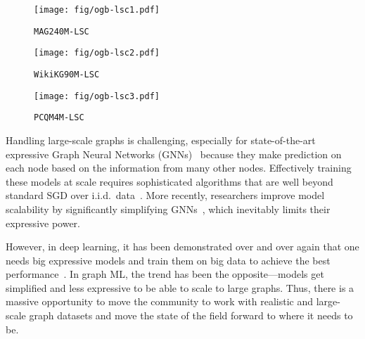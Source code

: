 \documentclass{article}
\newcommand{\challengeshort}{OGB-LSC}
\newcommand{\ag}{\texttt{MAG240M-LSC}}
\newcommand{\wiki}{\texttt{WikiKG90M-LSC}}
\newcommand{\mol}{\texttt{PCQM4M-LSC}}
\newcommand{\cf}{\textit{cf.}}
\begin{document}
\begin{figure*}[t]
  \centering
  \hfill{}
  \begin{subfigure}[t]{0.32\textwidth}
    \centering
    \texttt{[image: fig/ogb-lsc1.pdf]}
    \caption{\ag{}}
  \end{subfigure}
  \hfill{}
  \begin{subfigure}[t]{0.32\textwidth}
    \centering
    \texttt{[image: fig/ogb-lsc2.pdf]}
    \caption{\wiki{}}
  \end{subfigure}
  \hfill{}
  \begin{subfigure}[t]{0.32\textwidth}
    \centering
    \texttt{[image: fig/ogb-lsc3.pdf]}
    \caption{\mol{}}
  \end{subfigure}
  \hfill{}
  \caption{\textbf{Overview of the three \challengeshort{} datasets, covering node-, link-, and graph-level prediction tasks.} \textbf{(a)} \ag{} is a heterogeneous academic graph, and the task is to predict the subject areas of papers (\cf~Section~\ref{subsec:node}) situated in the heterogeneous graph. 
      \textbf{(b)} \wiki{} is a knowledge graph, and the task is to impute missing triplets (\cf~Section~\ref{subsec:link}). \textbf{(c)} \mol{} is a quantum chemistry dataset, and the task is to predict an important molecular property, the HOMO-LUMO gap, of a given molecule (\cf~Section~\ref{subsec:graph}).}
  \label{fig:overview}
\end{figure*}

Handling large-scale graphs is challenging, especially for state-of-the-art expressive Graph Neural Networks (GNNs)~\citep{kipf2016semi,hamilton2017inductive,velivckovic2017graph} because they make prediction on each node based on the information from many other nodes. Effectively training these models at scale requires sophisticated algorithms that are well beyond standard SGD over i.i.d.~data~\citep{hamilton2017inductive,chen2018fastgcn,chiang2019cluster,zeng2019graphsaint}. 
More recently, researchers improve model scalability by significantly simplifying GNNs~\citep{wu2019simplifying,rossi2020sign,huang2020combining}, which inevitably limits their expressive power.

However, in deep learning, it has been demonstrated over and over again that one needs big expressive models and train them on big data to achieve the best performance~\citep{he2016deep,russakovsky2015imagenet,vaswani2017attention,devlin2018bert}. In graph ML, the trend has been the opposite---models get simplified and less expressive to be able to scale to large graphs. Thus, there is a massive opportunity to move the community to work with realistic and large-scale graph datasets and move the state of the field forward to where it needs to be.
\end{document}
